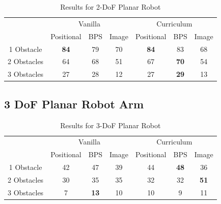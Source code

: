 \documentclass[conference]{IEEEtran}
\begin{document}
\begin{table}[!t]
	\renewcommand{\arraystretch}{1.3}
	\caption{Results for 2-DoF Planar Robot}
	\label{table:1}
	\centering
	\begin{tabular}{c|ccc|ccc|}
		\cline{2-7}
		& \multicolumn{3}{c|}{Vanilla}                                       & \multicolumn{3}{c|}{Curriculum}                                    \\ \cline{2-7} 
		& \multicolumn{1}{c|}{Positional} & \multicolumn{1}{c|}{BPS} & Image & \multicolumn{1}{c|}{Positional} & \multicolumn{1}{c|}{BPS} & Image \\ \hline
		\multicolumn{1}{|c|}{1 Obstacle}  & \multicolumn{1}{c|}{\textbf{84}}          & \multicolumn{1}{c|}{79}   & 70     & \multicolumn{1}{c|}{\textbf{84}}          & \multicolumn{1}{c|}{83}   & 68     \\ \hline
		\multicolumn{1}{|c|}{2 Obstacles} & \multicolumn{1}{c|}{64}          & \multicolumn{1}{c|}{68}   & 51     & \multicolumn{1}{c|}{67}          & \multicolumn{1}{c|}{\textbf{70}}   & 54     \\ \hline
		\multicolumn{1}{|c|}{3 Obstacles} & \multicolumn{1}{c|}{27}          & \multicolumn{1}{c|}{28}   & 12     & \multicolumn{1}{c|}{27}          & \multicolumn{1}{c|}{\textbf{29}}   & 13     \\ \hline
	\end{tabular}
\end{table}

\subsection{3 DoF Planar Robot Arm}

\begin{table}[!t]
	\renewcommand{\arraystretch}{1.3}
	\caption{Results for 3-DoF Planar Robot}
	\label{table:2}
	\centering
	\begin{tabular}{c|ccc|ccc|}
		\cline{2-7}
		& \multicolumn{3}{c|}{Vanilla}                                       & \multicolumn{3}{c|}{Curriculum}                                    \\ \cline{2-7} 
		& \multicolumn{1}{c|}{Positional} & \multicolumn{1}{c|}{BPS} & Image & \multicolumn{1}{c|}{Positional} & \multicolumn{1}{c|}{BPS} & Image \\ \hline
		\multicolumn{1}{|c|}{1 Obstacle}  & \multicolumn{1}{c|}{42}          & \multicolumn{1}{c|}{47}   & 39     & \multicolumn{1}{c|}{44}          & \multicolumn{1}{c|}{\textbf{48}}   & 36     \\ \hline
		\multicolumn{1}{|c|}{2 Obstacles} & \multicolumn{1}{c|}{30}          & \multicolumn{1}{c|}{35}   & 35     & \multicolumn{1}{c|}{32}          & \multicolumn{1}{c|}{32}   & \textbf{51}     \\ \hline
		\multicolumn{1}{|c|}{3 Obstacles} & \multicolumn{1}{c|}{7}          & \multicolumn{1}{c|}{\textbf{13}}   & 10     & \multicolumn{1}{c|}{10}          & \multicolumn{1}{c|}{9}   & 11     \\ \hline
	\end{tabular}
\end{table} 
\end{document}
